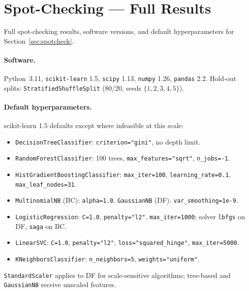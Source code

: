 \documentclass{article}
\begin{document}
\endgroup

\section{Spot-Checking --- Full Results}
\label{app:spotcheck}

Full spot-checking results, software versions, and default hyperparameters for Section~\ref{sec:spotcheck}.

\paragraph{Software.} Python~3.11, \texttt{scikit-learn} 1.5, \texttt{scipy} 1.13, \texttt{numpy} 1.26, \texttt{pandas} 2.2. Hold-out splits: \texttt{StratifiedShuffleSplit} (80/20, seeds $\{1,2,3,4,5\}$).

\paragraph{Default hyperparameters.} scikit-learn 1.5 defaults except where infeasible at this scale:
\begin{itemize}\itemsep0pt
  \item \texttt{DecisionTreeClassifier}: \texttt{criterion="gini"}, no depth limit.
  \item \texttt{RandomForestClassifier}: 100 trees, \texttt{max\_features="sqrt"}, \texttt{n\_jobs=-1}.
  \item \texttt{HistGradientBoostingClassifier}: \texttt{max\_iter=100}, \texttt{learning\_rate=0.1}, \texttt{max\_leaf\_nodes=31}.
  \item \texttt{MultinomialNB} (BC): \texttt{alpha=1.0}. \texttt{GaussianNB} (DF): \texttt{var\_smoothing=1e-9}.
  \item \texttt{LogisticRegression}: \texttt{C=1.0}, \texttt{penalty="l2"}, \texttt{max\_iter=1000}; solver \texttt{lbfgs} on DF, \texttt{saga} on BC.
  \item \texttt{LinearSVC}: \texttt{C=1.0}, \texttt{penalty="l2"}, \texttt{loss="squared\_hinge"}, \texttt{max\_iter=5000}.
  \item \texttt{KNeighborsClassifier}: \texttt{n\_neighbors=5}, \texttt{weights="uniform"}.
\end{itemize}
\texttt{StandardScaler} applies to DF for scale-sensitive algorithms; tree-based and \texttt{GaussianNB} receive unscaled features.
\end{document}
